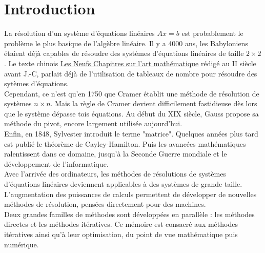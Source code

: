 \chapter{Introduction}
La résolution d'un système d'équations linéaires $Ax = b$ est probablement le problème le plus basique de l'algèbre linéaire. Il y a 4000 ans, les Babyloniens étaient déjà capables de résoudre des systèmes d'équations linéaires de taille $2\times 2$. Le texte chinois \underline{Les Neufs Chapitres sur l'art mathématique} rédigé au II\ieme{} siècle avant J.-C, parlait déjà de l'utilisation de tableaux de nombre pour résoudre des sytèmes d'équations.\\

 Cependant, ce n'est qu'en 1750 que Cramer établit une méthode de résolution de systèmes $n\times n$. Mais la règle de Cramer devient difficilement fastidieuse dès lors que le système dépasse tois équations. Au début du XIX\ieme{} siècle, Gauss propose sa méthode du pivot, encore largement utilisée aujourd'hui. \\

Enfin, en 1848, Sylvester introduit le terme "matrice". Quelques années plus tard est publié le théorème de Cayley-Hamilton. Puis les avancées mathématiques ralentissent dans ce domaine, jusqu'à la Seconde Guerre mondiale et le développement de l'informatique.\\

Avec l'arrivée des ordinateurs, les méthodes de résolutions de systèmes d'équations linéaires deviennent applicables à des systèmes de grande taille. L'augmentation des puissances de calculs permettent de développer de nouvelles méthodes de résolution, pensées directement pour des machines.\\

Deux grandes familles de méthodes sont développées en parallèle : les méthodes directes et les méthodes itératives. Ce mémoire est consacré aux méthodes itératives ainsi qu'à leur optimisation, du point de vue mathématique puis numérique.